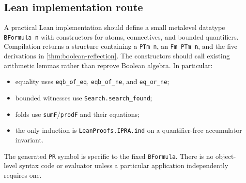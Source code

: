 \subsection{Lean implementation route}

A practical Lean implementation should define a small metalevel datatype \texttt{BFormula n} with constructors for atoms, connectives, and bounded quantifiers.  Compilation returns a structure containing a \texttt{PTm n}, an \texttt{Fm PTm n}, and the five derivations in \cref{thm:boolean-reflection}.  The constructors should call existing arithmetic lemmas rather than reprove Boolean algebra.  In particular:

\begin{itemize}[leftmargin=2em]
\item equality uses \texttt{eqb\_of\_eq}, \texttt{eqb\_of\_ne}, and \texttt{eq\_or\_ne};
\item bounded witnesses use \texttt{Search.search\_found};
\item folds use \texttt{sumF}/\texttt{prodF} and their equations;
\item the only induction is \texttt{LeanProofs.IPRA.ind} on a quantifier-free accumulator invariant.
\end{itemize}

The generated \texttt{PR} symbol is specific to the fixed \texttt{BFormula}.  There is no object-level syntax code or evaluator unless a particular application independently requires one.
